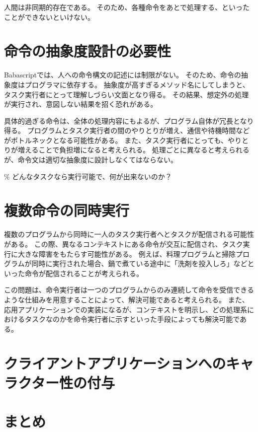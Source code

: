 人間は非同期的存在である。
そのため、各種命令をあとで処理する、といったことができないといけない。

\section{命令の抽象度設計の必要性}\label{ux547dux4ee4ux306eux62bdux8c61ux5ea6ux8a2dux8a08ux306eux5fc5ux8981ux6027}

Babascriptでは、人への命令構文の記述には制限がない。
そのため、命令の抽象度はプログラマに依存する。
抽象度が高すぎるメソッド名にしてしまうと、タスク実行者にとって理解しづらい文面となり得る。
その結果、想定外の処理が実行され、意図しない結果を招く恐れがある。

具体的過ぎる命令は、全体の処理内容にもよるが、プログラム自体が冗長となり得る。
プログラムとタスク実行者の間のやりとりが増え、通信や待機時間などがボトルネックとなる可能性がある。
また、タスク実行者にとっても、やりとりが増えることで負担増になると考えられる。
処理ごとに異なると考えられるが、命令文は適切な抽象度に設計しなくてはならない。

\% どんなタスクなら実行可能で、何が出来ないのか？

\section{複数命令の同時実行}\label{ux8907ux6570ux547dux4ee4ux306eux540cux6642ux5b9fux884c}

複数のプログラムから同時に一人のタスク実行者へとタスクが配信される可能性がある。
この際、異なるコンテキストにある命令が交互に配信され、タスク実行に大きな障害をもたらす可能性がある。
例えば、料理プログラムと掃除プログラムが同時に実行された場合、鍋で煮ている途中に「洗剤を投入しろ」などといった命令が配信されることが考えられる。

この問題は、命令実行者は一つのプログラムからのみ連続して命令を受信できるような仕組みを用意することによって、解決可能であると考えられる。
また、応用アプリケーションでの実装になるが、コンテキストを明示し、どの処理系におけるタスクなのかを命令実行者に示すといった手段によっても解決可能である。

\section{クライアントアプリケーションへのキャラクター性の付与}\label{ux30afux30e9ux30a4ux30a2ux30f3ux30c8ux30a2ux30d7ux30eaux30b1ux30fcux30b7ux30e7ux30f3ux3078ux306eux30adux30e3ux30e9ux30afux30bfux30fcux6027ux306eux4ed8ux4e0e}

\section{まとめ}\label{ux307eux3068ux3081}
